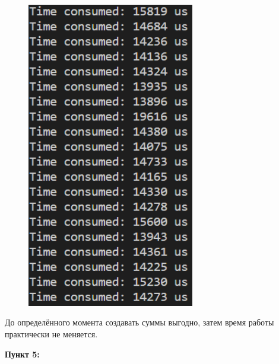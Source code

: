 \documentclass[a4paper,12pt]{article}
\begin{document}
\begin{figure}[H]
{\begin{minipage}[t]{0.4\textwidth}
        \includegraphics[width = 0.65\textwidth]{Optimized C++ 6sum.png}
    \end{minipage}}
\end{figure}
До определённого момента создавать суммы выгодно, затем время работы практически не меняется.

\textbf{Пункт 5: }
\end{document}
